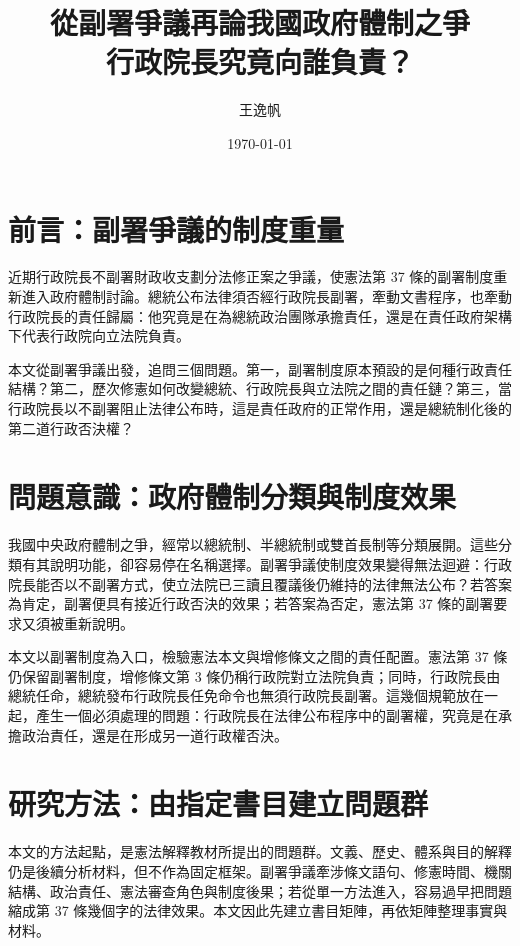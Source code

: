 \documentclass[12pt]{ctexart}
\title{從副署爭議再論我國政府體制之爭\\
\large 行政院長究竟向誰負責？}
\author{王逸帆}
\date{\today}
\begin{document}
\maketitle

\section{前言：副署爭議的制度重量}

近期行政院長不副署財政收支劃分法修正案之爭議，使憲法第 37 條的副署制度重新進入政府體制討論。總統公布法律須否經行政院長副署，牽動文書程序，也牽動行政院長的責任歸屬：他究竟是在為總統政治團隊承擔責任，還是在責任政府架構下代表行政院向立法院負責。

本文從副署爭議出發，追問三個問題。第一，副署制度原本預設的是何種行政責任結構？第二，歷次修憲如何改變總統、行政院長與立法院之間的責任鏈？第三，當行政院長以不副署阻止法律公布時，這是責任政府的正常作用，還是總統制化後的第二道行政否決權？

\section{問題意識：政府體制分類與制度效果}

我國中央政府體制之爭，經常以總統制、半總統制或雙首長制等分類展開。這些分類有其說明功能，卻容易停在名稱選擇。副署爭議使制度效果變得無法迴避：行政院長能否以不副署方式，使立法院已三讀且覆議後仍維持的法律無法公布？若答案為肯定，副署便具有接近行政否決的效果；若答案為否定，憲法第 37 條的副署要求又須被重新說明。

本文以副署制度為入口，檢驗憲法本文與增修條文之間的責任配置。憲法第 37 條仍保留副署制度，增修條文第 3 條仍稱行政院對立法院負責；同時，行政院長由總統任命，總統發布行政院長任免命令也無須行政院長副署。這幾個規範放在一起，產生一個必須處理的問題：行政院長在法律公布程序中的副署權，究竟是在承擔政治責任，還是在形成另一道行政權否決。

\section{研究方法：由指定書目建立問題群}

本文的方法起點，是憲法解釋教材所提出的問題群。文義、歷史、體系與目的解釋仍是後續分析材料，但不作為固定框架。副署爭議牽涉條文語句、修憲時間、機關結構、政治責任、憲法審查角色與制度後果；若從單一方法進入，容易過早把問題縮成第 37 條幾個字的法律效果。本文因此先建立書目矩陣，再依矩陣整理事實與材料。
\end{document}
